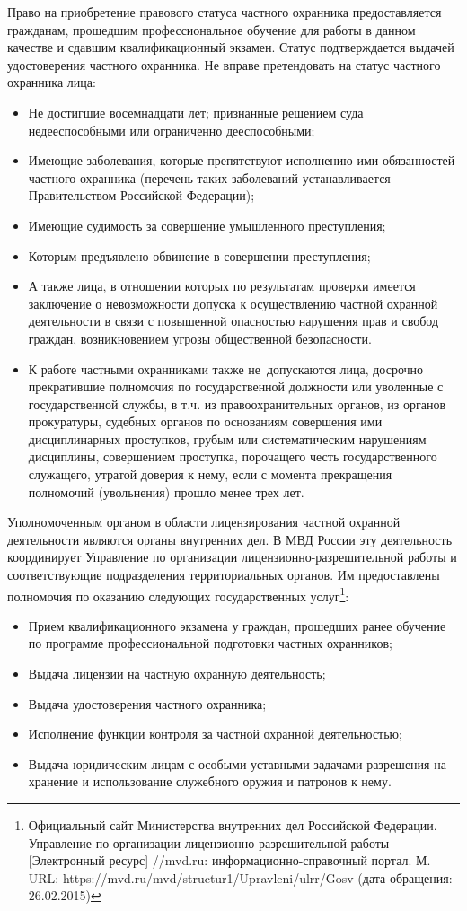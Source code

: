 \documentclass[a4paper,12pt,fleqn]{article} %
\begin{document}
Право на приобретение правового статуса частного охранника предоставляется гражданам, прошедшим профессиональное обучение для работы в данном качестве и сдавшим квалификационный экзамен. Статус подтверждается выдачей удостоверения частного охранника. Не вправе претендовать на статус частного охранника лица:
\begin{itemize}
	\item Не достигшие восемнадцати лет; признанные решением суда недееспособными или ограниченно дееспособными;
	\item Имеющие заболевания, которые препятствуют исполнению ими обязанностей частного охранника (перечень таких заболеваний устанавливается Правительством Российской Федерации);
	\item Имеющие судимость за совершение умышленного преступления; 
	\item Которым предъявлено обвинение в совершении преступления; 
	\item А также лица, в отношении которых по результатам проверки имеется заключение о невозможности допуска к осуществлению частной охранной деятельности в связи с повышенной опасностью нарушения прав и свобод граждан, возникновением угрозы общественной безопасности. 
	\item К работе частными охранниками также не~допускаются лица, досрочно прекратившие полномочия по государственной должности или уволенные с государственной службы, в т.ч. из правоохранительных органов, из органов прокуратуры, судебных органов по основаниям совершения ими дисциплинарных проступков, грубым или систематическим нарушениям дисциплины, совершением проступка, порочащего честь государственного служащего, утратой доверия к нему, если с момента прекращения полномочий (увольнения) прошло менее трех лет. 
\end{itemize}

Уполномоченным органом в области лицензирования частной охранной деятельности являются органы внутренних дел. В МВД России эту деятельность координирует Управление по организации лицензионно-разрешительной работы и соответствующие подразделения территориальных органов. Им предоставлены полномочия по оказанию следующих государственных услуг\footnote{Официальный сайт Министерства внутренних дел Российской Федерации. Управление по организации лицензионно-разрешительной работы [Электронный ресурс] //mvd.ru: информационно-справочный портал. М. URL: https://mvd.ru/mvd/structur1/Upravleni/ulrr/Gosv (дата обращения: 26.02.2015)}:

\begin{itemize}
	\item Прием квалификационного экзамена у граждан, прошедших ранее обучение по программе профессиональной подготовки частных охранников;
	\item Выдача лицензии на частную охранную деятельность;
	\item Выдача удостоверения частного охранника;
	\item Исполнение функции контроля за частной охранной деятельностью;
	\item Выдача юридическим лицам с особыми уставными задачами разрешения на хранение и использование служебного оружия и патронов к нему.
\end{itemize}
\end{document}
